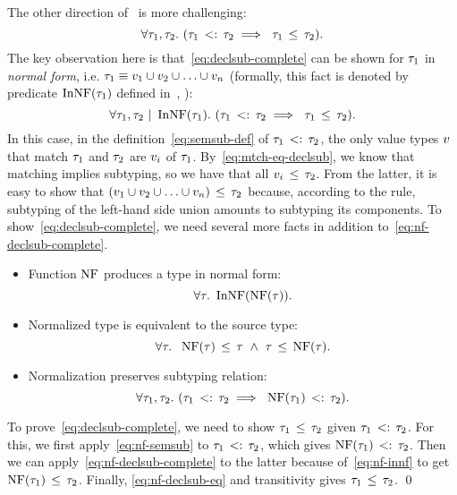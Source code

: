 The other direction of~ is more challenging: 
\begin{equation}\label{eq:declsub-complete}
\forall \ty_1, \ty_2.\ 
(\bjsemsub{\ty_1}{\ty_2} \implies\ \bjsub{\ty_1}{\ty_2}).
\end{equation}
The key observation here is that~\eqref{eq:declsub-complete} can be shown 
for $\tau_1$ in \emph{normal form},
i.e. $\tau_1 \equiv v_1 \cup v_2 \cup \ldots \cup v_n$
(formally, this fact is denoted by predicate $\mathop{\mathrm{InNF}}(\tau_1)$ 
defined in~, ):
\begin{equation}\label{eq:nf-declsub-complete}
\forall \tau_1, \tau_2 ~\vert~ \mathop{\mathrm{InNF}}(\tau_1).\
(\tau_1 \, <: \, \tau_2 \implies\ \tau_1 \, \leq \, \tau_2).
\end{equation}
In this case, in the definition~\eqref{eq:semsub-def}
of $\tau_1 \, <: \, \tau_2$, the only
value types $v$ that match $\tau_1$ and $\tau_2$ are $v_i$ of $\tau_1$. 
By~\eqref{eq:mtch-eq-declsub}, we know that matching implies subtyping,
so we have that all $v_i \, \leq \, \tau_2$.
From the latter, it is easy to show that 
$(v_1 \cup v_2 \cup \ldots \cup v_n) \, \leq \, \tau_2$ because,
according to the \RD{UnionL} rule,
subtyping of the left-hand side union amounts to subtyping its components.
To show~\eqref{eq:declsub-complete}, we need several more facts
in addition to~\eqref{eq:nf-declsub-complete}.
\begin{itemize}
  \item Function $\mathop{\mathrm{NF}}$ produces a type in normal form:
	\begin{equation}\label{eq:nf-innf}
	\forall \tau.\ \mathop{\mathrm{InNF}}(\mathop{\mathrm{NF}}(\tau)).
	\end{equation}
  \item Normalized type is equivalent to the source type:
    \begin{equation}\label{eq:nf-declsub-eq}
    \forall \ty.\;\ \bjsub{\NF(\ty)}{\ty}\ \land\ \bjsub{\ty}{\NF(\ty)}.
    \end{equation}
  \item Normalization preserves subtyping relation:
    \begin{equation}\label{eq:nf-semsub}
    \forall \ty_1, \ty_2.\ 
    (\bjsemsub{\ty_1}{\ty_2} \implies\ \bjsemsub{\NF(\ty_1)}{\ty_2}).
    \end{equation}
\end{itemize}
To prove~\eqref{eq:declsub-complete}, we need to show $\tau_1 \, \leq \, \tau_2$
given $\tau_1 \, <: \, \tau_2$. 
For this, we first apply~\eqref{eq:nf-semsub} to $\tau_1 \, <: \, \tau_2$,
which gives $\mathop{\mathrm{NF}}(\tau_1) \, <: \, \tau_2$. 
Then we can apply~\eqref{eq:nf-declsub-complete} to the latter
because of~\eqref{eq:nf-innf} to get $\mathop{\mathrm{NF}}(\tau_1) \, \leq \, \tau_2$.
Finally, \eqref{eq:nf-declsub-eq} and transitivity 
gives $\tau_1 \, \leq \, \tau_2$. \qed

